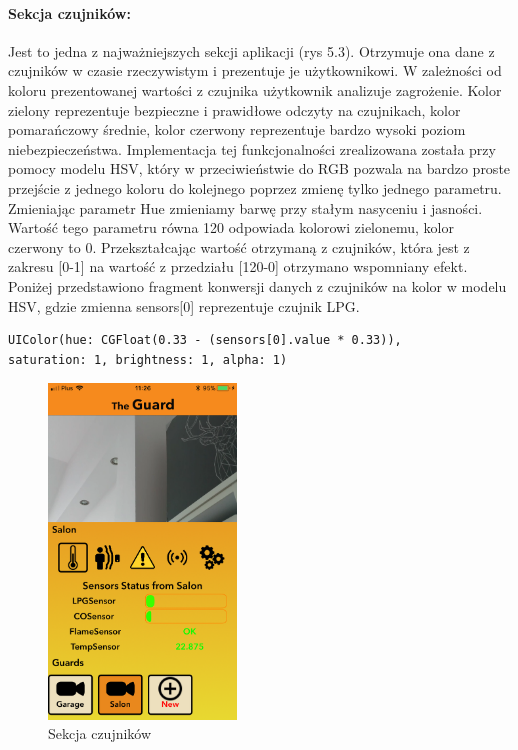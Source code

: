 \paragraph{Sekcja czujników:}
Jest to jedna z najważniejszych sekcji aplikacji (rys 5.3).  Otrzymuje ona dane z czujników w czasie rzeczywistym i prezentuje je użytkownikowi.  W zależności od koloru prezentowanej wartości z czujnika użytkownik analizuje zagrożenie. Kolor zielony reprezentuje bezpieczne i prawidłowe odczyty na czujnikach, kolor pomarańczowy średnie, kolor czerwony reprezentuje bardzo wysoki poziom niebezpieczeństwa. Implementacja tej funkcjonalności zrealizowana została przy pomocy modelu HSV, który w przeciwieństwie do RGB pozwala na bardzo proste przejście z jednego koloru do kolejnego poprzez zmienę tylko jednego parametru. Zmieniając parametr Hue zmieniamy barwę przy stałym nasyceniu i jasności. Wartość tego parametru równa 120\textdegree{} odpowiada kolorowi zielonemu, kolor czerwony to 0\textdegree{}. Przekształcając wartość otrzymaną z czujników, która jest z zakresu [0-1] na wartość z przedziału [120-0] otrzymano wspomniany efekt. 
Poniżej przedstawiono fragment konwersji danych z czujników na kolor w modelu HSV, gdzie zmienna sensors[0] reprezentuje czujnik LPG.
\begin{verbatim}
UIColor(hue: CGFloat(0.33 - (sensors[0].value * 0.33)),
saturation: 1, brightness: 1, alpha: 1)
\end{verbatim}
\begin{figure}[h]
	\centering
	\includegraphics[width=5cm]{sensors.png}
	\caption{Sekcja czujników}
\end{figure}
